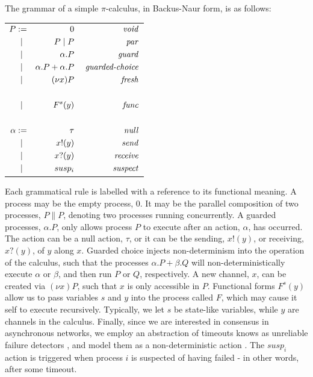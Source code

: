 The grammar of a simple $\pi$-calculus, in Backus-Naur form, is as follows:


\begin{center}
	\begin{tabular}{l }
		{$\!\begin{aligned}
			P & := & 0  & & \text{ \emph{void}}\\
			    & \; \| & P \| P  & & \text{ \emph{par}} \\
			    & \; \| & \alpha.P  & & \text{ \emph{guard}} \\
			    & \; \| & \alpha.P  + \alpha.P & & \text{ \emph{guarded-choice}} \\
			    & \; \| & (\nu x) P & & \text{ \emph{fresh}}\\ \\
			    & \; \| & F^{s}(y) & & \text{ \emph{func}}\\ \\

			\alpha & := & \tau & & \text{ \emph{null}} \\
			    & \; \| & x!(y) & & \text{ \emph{send}} \\
			    & \; \| & x?(y) & & \text{ \emph{receive}}\\
			    & \; \| & susp_i & & \text{ \emph{suspect}}\\
		\end{aligned}$} \\ 
	\end{tabular}
\end{center}

Each grammatical rule is labelled with a reference to its functional meaning.
A process may be the empty process, $0$.
It may be the parallel composition of two processes, $P \| P$,
denoting two processes running concurrently.
A guarded processes, $\alpha.P$, only allows process $P$ to execute after an action, $\alpha$,
has occurred.
The action can be a null action, $\tau$, or it can be the sending, $x!(y)$, 
or receiving, $x?(y)$, of $y$ along $x$.
Guarded choice injects non-determinism into the operation of the calculus, 
such that the processes $\alpha.P + \beta.Q$ will non-deterministically execute
$\alpha$ or $\beta$, and then run $P$ or $Q$, respectively.
A new channel, $x$, can be created via $(\nu x) P$, such that $x$ is only accessible in $P$.
Functional forms $F^{s}(y)$ allow us to pass variables $s$ and $y$ into 
the process called $F$, which may cause it self to execute recursively. 
Typically, we let $s$ be state-like variables, while $y$ are channels in the calculus.
Finally, since we are interested in consensus in asynchronous networks, 
we employ an abstraction of timeouts knows as unreliable failure detectors \cite{chandra1996unreliable},
and model them as a non-deterministic action \cite{nestmann2003modeling}.
The $susp_i$ action is triggered when process $i$ is suspected of having failed -
in other words, after some timeout.

